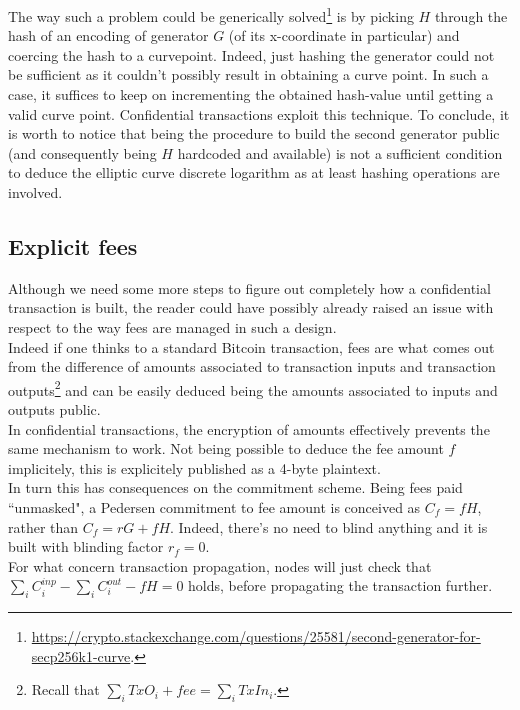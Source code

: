 The way such a problem could be generically solved\footnote{\url{https://crypto.stackexchange.com/questions/25581/second-generator-for-secp256k1-curve}.} is by picking $H$ through the hash of an encoding of generator $G$ (of its x-coordinate in particular) and coercing the hash to a curvepoint. Indeed, just hashing the generator could not be sufficient as it couldn't possibly result in obtaining a curve point. In such a case, it suffices to keep on incrementing the obtained hash-value until getting a valid curve point. Confidential transactions exploit this technique. To conclude, it is worth to notice that being the procedure to build the second generator public (and consequently being $H$ hardcoded and available) is not a sufficient condition to deduce the elliptic curve discrete logarithm as at least hashing operations are involved.

\subsection{Explicit fees}
Although we need some more steps to figure out completely how a confidential transaction is built, the reader could have possibly already raised an issue with respect to the way fees are managed in such a design.\\
Indeed if one thinks to a standard Bitcoin transaction, fees are what comes out from the difference of amounts associated to transaction inputs and transaction outputs\footnote{Recall that $\sum_i TxO_i + fee = \sum_i TxIn_i$.} and can be easily deduced being the amounts associated to inputs and outputs public.\\
In confidential transactions, the encryption of amounts effectively prevents the same mechanism to work. Not being possible to deduce the fee amount $f$ implicitely, this is explicitely published as a 4-byte plaintext.\\
In turn this has consequences on the commitment scheme. Being fees paid ``unmasked", a Pedersen commitment to fee amount is conceived as $C_f = fH$, rather than $C_f = rG + fH$. Indeed, there's no need to blind anything and it is built with blinding factor $r_f=0$.\\
For what concern transaction propagation, nodes will just check that $\sum_i C_i^{inp} - \sum_i C_i^{out} - fH = 0$ holds, before propagating the transaction further.

